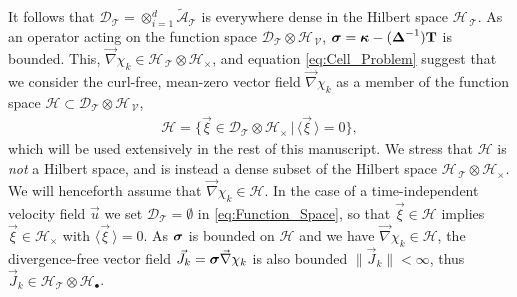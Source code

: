 \documentclass[11pt]{amsart}
\newcommand{\Tb}{\mathbf{T}}
\newcommand{\Tc}{\mathcal{T}}
\newcommand{\Vc}{\mathcal{V}}
\newcommand{\Hs}{\mathscr{H}}
\newcommand{\As}{\mathscr{A}}
\newcommand{\Ds}{\mathscr{D}}
\newcommand\bsig{\mbox{\boldmath${\sigma}$}}
\newcommand\bDelta{\mbox{\boldmath${\Delta}$}}
\newcommand\bkappa{\mbox{\boldmath${\kappa}$}}
\begin{document}
It follows that $\Ds_{\Tc}=\otimes_{i=1}^d\tilde{\As}_{\Tc}$ is everywhere
dense in the Hilbert space $\Hs_{\,\Tc}$. As an operator acting on the
function  space $\Ds_{\Tc}\otimes\Hs_{\,\Vc}$, $\bsig=\bkappa-(\bDelta^{-1})\Tb$ is
bounded. This, $\vec{\nabla}\chi_k\in\Hs_{\,\Tc}\otimes\Hs_\times$, and equation
\eqref{eq:Cell_Problem} suggest that we consider the curl-free,
mean-zero vector field $\vec{\nabla}\chi_k$ as a member of the function space 
$\Hs\subset\Ds_{\Tc}\otimes\Hs_{\,\Vc}$,   
%
\begin{align}\label{eq:Function_Space}
  \Hs=\{\vec{\xi}\in\Ds_{\Tc}\otimes\Hs_\times \,|\, \langle\vec{\xi}\,\rangle=0\},  
\end{align}
%
which will be used extensively in the rest of this manuscript. We
stress that $\Hs$ is \emph{not} a Hilbert space, and is instead a
dense subset of the Hilbert space $\Hs_{\,\Tc}\otimes\Hs_\times$. We will
henceforth assume that $\vec{\nabla}\chi_k\in\Hs$. In the case of a
time-independent velocity field $\vec{u}$ we set $\Ds_{\Tc}=\emptyset$ in 
\eqref{eq:Function_Space}, so that $\vec{\xi}\in\Hs$ implies 
$\vec{\xi}\in\Hs_\times$ with $\langle\vec{\xi}\,\rangle=0$. As $\bsig$ is bounded on $\Hs$
and we have $\vec{\nabla}\chi_k\in\Hs$, the divergence-free vector field
$\vec{J}_k=\bsig\vec{\nabla}\chi_k$ is also bounded $\|\vec{J}_k\|<\infty$, thus
$\vec{J}_k\in\Hs_{\Tc}\otimes\Hs_\bullet$.   
\end{document}
